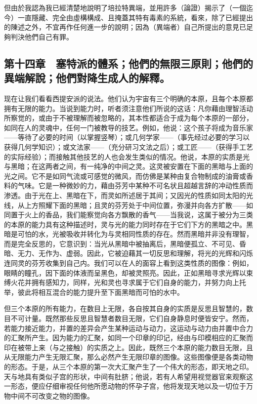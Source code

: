 但由於我認為我已經清楚地說明了培拉特異端，並用許多（論證）揭示了（一個迄今）一直隱藏、完全由虛構構成、且掩蓋其特有毒素的系統，看來，除了已經提出的陳述之外，不宜再作任何進一步的說明；因為（異端者）自己所提出的意見已足夠判決他們自己有罪。\par


\subsection{第十四章　塞特派的體系；他們的無限三原則；他們的異端解說；他們對降生成人的解釋。}

现在让我们看看西提安派的说法。他们认为宇宙有三个明确的本原，且每个本原都拥有无限的能力。当说到能力时，听者须注意他们所说的这话：凡你藉由理智活动所察觉的，或由于不被理解而被忽略的，其本性都适合于成为每个本原的一部分，如同在人的灵魂中，任何一门被教导的技艺。例如，他说：这个孩子将成为音乐家——等待了必要的时间（以掌握竖琴）；或几何学家——（事先经过必要的学习以获得几何学知识）；或文法家——（充分研习文法之后）；或工匠——（获得手工艺的实际经验）；而接触其他技艺的人也会发生类似的情况。他说，本原的实质是光与黑暗；在这两者之间，有一纯净的中间之灵。这灵被安置在下面的黑暗与上面的光之间。它不是如同气流或可感觉的微风，而仿佛是某种由复合物制成的油膏或香料的气味。它是一种微妙的力，藉由芬芳中某种不可名状且超越言辞的冲动性质而渗透。由于光在上、黑暗在下，而灵如所述居于其间；又因光的性质如同太阳的光线，从上方照耀下面的黑暗；且灵的芬芳处于中间位置，弥漫并向各方扩散——如同置于火上的香品，我们能察觉向各方飘散的香气——当我说，这属于被分为三类的本原的能力具有这种描述时，灵与光的能力同时存在于它们下方的黑暗之中。黑暗是可怕的水，光被吸收并转化为与灵相同性质的存在。然而黑暗并非没有理智，而是完全反思的，它意识到：当光从黑暗中被抽离后，黑暗便孤立、不可见、昏暗、无力、无作为、虚弱。因此，它被迫藉其一切反思和理解，将光的光辉和闪烁连同灵的芬芳收集到自己内。我们可以在人的面容上看到这类性质的图像：例如，眼睛的瞳孔，因下面的体液而呈黑色，却被灵照亮。因此，正如黑暗寻求光辉以束缚火花并拥有感知力，同样，光和灵也寻求属于它们自身的能力，并努力向上托举，彼此将相互混合的能力提升至下面黑暗而可怕的水中。\par

但三个本原的所有能力，在数目上无限，各自按其自身的实质是反思且智慧的，数目不可计量。既然那些反思且智慧者数目无限，它们自身静息时便皆安宁。然而，若能力接近能力，并置的差异会产生某种运动与动力，这运动与动力由并置中合力的汇聚所产生。因为能力的汇聚，如同一个印章的印记，经由与印模相应的汇聚而印在被带上来（与之接触）的实质之上。因此，既然三个本原的能力数目无限，且从无限能力产生无限汇聚，那么必然产生无限印章的图像。这些图像便是各类动物的形态。于是，从三个本原的第一次大汇聚产生了一个伟大的形态，即天地之印。天与地具有类似子宫的形状，中间有肚脐；他说，若有人希望用视觉器官来观察这一形态，便应仔细审视任何他所愿动物的怀孕子宫，他将发现天地以及一切位于万物中间不可改变之物的图像。\par

